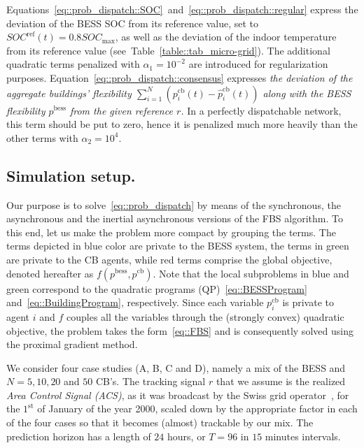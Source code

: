 \documentclass[envcountsect]{svjour3}
\begin{document}
Equations~\eqref{eq::prob_dispatch::SOC}~and~\eqref{eq::prob_dispatch::regular} express the deviation of the BESS SOC from its reference value, set to $SOC^\mathrm{ref}(t)=0.8SOC_{\max}$, as well as the deviation of the indoor temperature from its reference value (see~Table~\ref{table::tab_micro-grid}). The additional quadratic terms penalized with $\alpha_1=10^{-2}$ are introduced for regularization purposes. Equation~\eqref{eq::prob_dispatch::consensus} expresses \emph{the deviation of the aggregate buildings' flexibility $\sum_{i=1}^N(p_i^\mathrm{cb}(t)-\hat{p}_i^\mathrm{cb}(t))$ along with the BESS flexibility $p^\mathrm{bess}$ from the given reference $r$.} In a perfectly dispatchable network, this term should be put to zero, hence it is penalized much more heavily than the other terms with $\alpha_2=10^4$.

\subsection{Simulation setup. }
Our purpose is to solve~\eqref{eq::prob_dispatch} by means of the synchronous, the asynchronous and the inertial asynchronous versions of the FBS algorithm.
To this end, let us make the problem more compact by grouping the terms. The terms depicted in blue color are private to the BESS system, the terms in green are private to the CB agents, while red terms comprise the global objective, denoted hereafter as $f(p^\mathrm{bess},p^\mathrm{cb})$. Note that the local subproblems in blue and green correspond to the quadratic programs (QP)~\eqref{eq::BESSProgram} and~\eqref{eq::BuildingProgram}, respectively. Since each variable $p^\mathrm{cb}_i$ is private to agent $i$ and $f$ couples all the variables through the (strongly convex) quadratic objective, the problem takes the form~\eqref{eq::FBS} and is consequently solved using the proximal gradient method.

We consider four case studies (A, B, C and D), namely a mix of the BESS and $N=5,10,20$ and $50$ CB's. The tracking signal $r$ that we assume is the realized
\emph{Area Control Signal (ACS)}, as it was broadcast by the Swiss grid operator~\cite{ACS}, for
the $1^{\mathrm{st}}$ of January of the year 2000, scaled down by the appropriate factor in each of the four cases so that it becomes (almost) trackable by our mix. The prediction horizon has a length of $24$ hours, or $T=96$ in $15$ minutes intervals.
\end{document}
